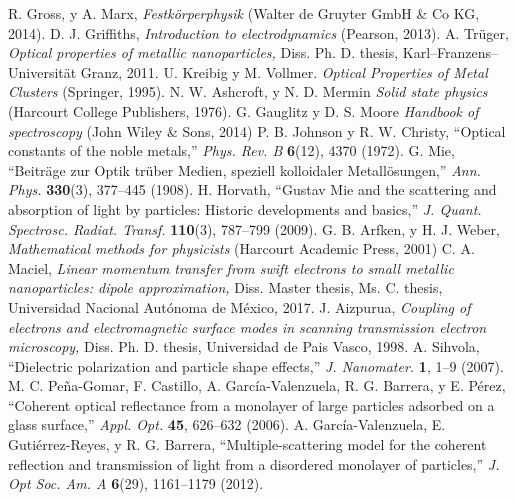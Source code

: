 \documentclass[letterpaper,11pt] {article}
\begin{document}
\begin{thebibliography}{     }
%
 R.  Gross, y A.  Marx, \emph{Festkörperphysik} (Walter de Gruyter GmbH \& Co KG, 2014). 
%
 D. J.  Griffiths, \emph{Introduction to electrodynamics} (Pearson, 2013). 
%
 A.  Tr\"uger, \emph{Optical properties of metallic nanoparticles,} Diss.  Ph.  D.  thesis, Karl--Franzens--Universit\"at Granz, 2011. 
%
 U.  Kreibig y M.  Vollmer.  \emph{Optical Properties of Metal Clusters} (Springer, 1995). 
%
 N.  W.  Ashcroft, y N.  D.  Mermin \emph{Solid state physics} (Harcourt College Publishers, 1976). 
%
 G.  Gauglitz y D. S.  Moore \emph{Handbook of spectroscopy} (John Wiley \& Sons, 2014)
%
 P.  B.  Johnson y R.  W.  Christy, ``Optical constants of the noble metals,'' \emph{Phys.  Rev.  B} \textbf{6}(12), 4370 (1972). 
%
 G.  Mie,  ``Beiträge zur Optik trüber Medien, speziell kolloidaler Metallösungen,'' \emph{Ann.  Phys. } \textbf{330}(3), 377–445 (1908). 
%
 H.  Horvath, ``Gustav Mie and the scattering and absorption of light by particles: Historic developments and basics,'' \emph{J.  Quant.  Spectrosc.  Radiat.  Transf. } \textbf{110}(3), 787–799 (2009). 
%
 G.  B.  Arfken, y  H.  J.  Weber, \emph{Mathematical methods for physicists} (Harcourt Academic Press, 2001)
%
 C.  A.  Maciel, \emph{Linear momentum transfer from swift electrons to small metallic nanoparticles: dipole approximation,} Diss.  Master thesis, Ms.  C.  thesis, Universidad Nacional Autónoma de México, 2017. 
%
 J.  Aizpurua, \emph{Coupling of electrons and electromagnetic surface modes in scanning transmission electron microscopy,} Diss.  Ph.  D.  thesis, Universidad de Pais Vasco, 1998. 
%
 A.  Sihvola, ``Dielectric polarization and particle shape effects,'' \emph{J.  Nanomater. } \textbf{1}, 1--9 (2007). 
%
 M.  C.  Peña-Gomar, F.  Castillo, A.  García-Valenzuela, R.  G.  Barrera, y E.  Pérez, ``Coherent optical reflectance from a monolayer of large particles adsorbed on a glass surface,'' \emph{Appl.  Opt. } \textbf{45}, 626–632 (2006). 
%
 A.  Garc\'ia-Valenzuela, E.  Guti\'errez-Reyes, y R.  G.  Barrera, ``Multiple-scattering model for the coherent reflection and transmission of light from a disordered monolayer of particles,'' \textit{J.  Opt Soc.  Am.  A} \textbf{6}(29), 1161--1179 (2012). 

\end{thebibliography}
\end{document}
